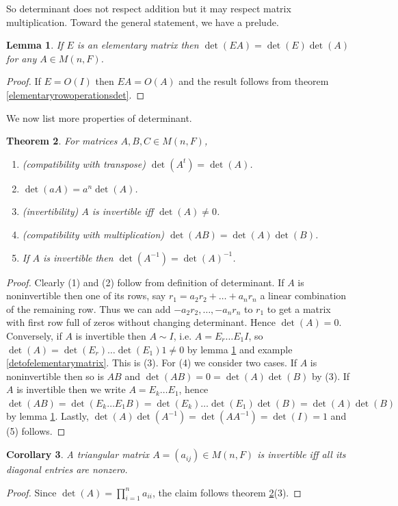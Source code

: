 \documentclass[12pt]{amsart}
\newtheorem{theorem}{Theorem}[section]
\newtheorem{lemma}[theorem]{Lemma}
\newtheorem{corollary}[theorem]{Corollary}
\theoremstyle{definition}
\begin{document}
So determinant does not respect addition but it may respect matrix multiplication. Toward the general statement, we have a prelude.

\begin{lemma}\label{detEAequalsdetEdetA} If $E$ is an elementary matrix then $\det(EA) = \det(E)\det(A)$ for any $A \in M(n, F)$.
\end{lemma}
\begin{proof} If $E = O(I)$ then $EA = O(A)$ and the result follows from theorem \ref{elementaryrowoperationsdet}.
\end{proof}

We now list more properties of determinant.
\begin{theorem}\label{propertiesofdeterminant} For matrices $A, B, C \in M(n, F)$,
\begin{enumerate}[\indent 1.]
\item (compatibility with transpose) $\det(A^t) = \det(A)$.
\item $\det(a A) = a^n \det(A)$.
\item (invertibility) $A$ is invertible iff $\det(A) \neq 0$.
\item (compatibility with multiplication) $\det(AB) = \det(A)\det(B)$.
\item If $A$ is invertible then $\det(A^{-1}) = \det(A)^{-1}$.
\end{enumerate}
\end{theorem}
\begin{proof} Clearly (1) and (2) follow from definition of determinant. If $A$ is noninvertible then one of its rows, say $r_1 = a_2 r_2 + \ldots + a_n r_n$ a linear combination of the remaining row. Thus we can add $-a_2 r_2, \dots , - a_n r_n$ to $r_1$ to get a matrix with first row full of zeros without changing determinant. Hence $\det(A) = 0$. Conversely, if $A$ is invertible then $A \sim I$, i.e. $A = E_r \dots E_1I$, so $\det(A) = \det(E_r) \dots \det(E_1)1 \neq 0$ by lemma \ref{detEAequalsdetEdetA} and example \ref{detofelementarymatrix}. This is (3). For (4) we consider two cases. If $A$ is noninvertible then so is $AB$ and $\det(AB) = 0 = \det(A)\det(B)$ by (3). If $A$ is invertible then we write $A = E_k \dots E_1$, hence $\det(AB) = \det(E_k \dots E_1B) = \det(E_k) \dots \det(E_1)\det(B) = \det(A)\det(B)$ by lemma \ref{detEAequalsdetEdetA}. Lastly, $\det(A)\det(A^{-1}) = \det(AA^{-1}) = \det(I) = 1$ and (5) follows.
\end{proof}

\begin{corollary}\label{invertibletriangularmatrix} A triangular matrix $A = (a_{ij}) \in M(n, F)$ is invertible iff all its diagonal entries are nonzero.
\end{corollary}
\begin{proof} Since $\det(A) = \prod\limits_{i=1}^n a_{ii}$, the claim follows theorem \ref{propertiesofdeterminant}(3).
\end{proof}
\end{document}
